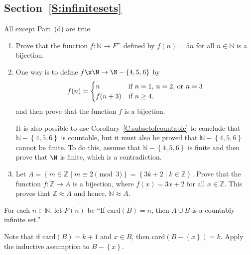 \subsection*{Section~\ref{S:infinitesets}}

\begin{list}{\bf{\ref{exer:sec93-1}.}}
\item All except Part~(d) are true.
\end{list}



\begin{list}{\bf{\ref{exer:sec93-2}.}}
\item \begin{enumerate}
\item Prove that the function $f: \mathbb{N} \to F^+$ defined by $f \left( n \right) = 5n$ for all 
$n \in \mathbb{N}$ is a bijection. 
\setcounter{enumi}{4}
\item  One way is to define $f\x \N \to \N -\{4, 5, 6 \}$ by
\begin{equation} \notag
f( n ) = 
\begin{cases}
n                        &\text{if $n = 1$, $n = 2$, or $n = 3$} \\
f ( n + 3 )   &\text{if $n \geq 4$}.
\end{cases}
\end{equation}
and then prove that the function $f$ is a bijection.

It is also possible to use Corollary~\ref{C:subsetofcountable} to conclude that $\mathbb{N} - \left\{ 4, 5, 6 \right\}$ is countable, but it must also be proved that $\mathbb{N} - \left\{ 4, 5, 6 \right\}$ cannot be finite.  To do this, assume that $\mathbb{N} - \left\{ 4, 5, 6 \right\}$ is finite and then prove that $\N$ is finite, which is a contradiction.
\item  Let $A = \left\{ m \in \mathbb{Z} \mid m \equiv 2 \pmod 3 \right\} = 
\left\{ 3k + 2 \mid k \in \mathbb{Z} \right\}$.  Prove that the function $f: \mathbb{Z} \to A$ is a bijection, where $f \left( x \right) = 3x + 2$ for all $x \in \mathbb{Z}$.  This proves that 
$\mathbb{Z} \approx A$ and hence, $\mathbb{N} \approx A$.
\end{enumerate}
\end{list}



\begin{list}{\bf{\ref{exer:addfinitetocountable}.}}
\item For each $n \in \mathbb{N}$, let $P ( n )$ be ``If 
$\text{card} ( B ) = n$, then $A \cup B$ is a countably infinite set.''

Note that if $\text{card} ( B ) = k+1$ and $x \in B$, then 
$\text{card} ( B - \left\{ x \right\} ) = k$.  Apply the inductive assumption to 
$B - \left\{ x \right\}$.
\end{list}



